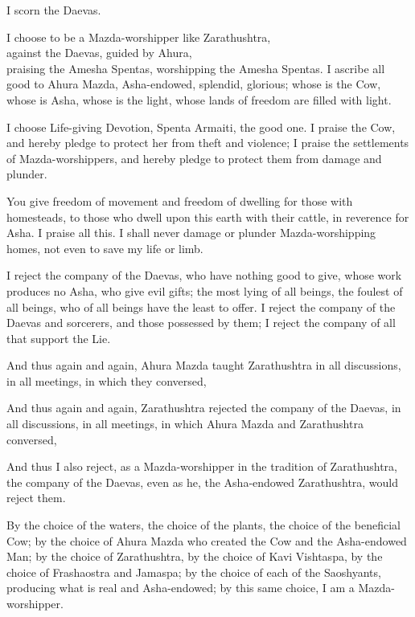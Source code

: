 \documentclass{book}
\begin{document}
\beforeeledchapter

\begin{pages}

\begin{Leftside}
\beginnumbering

\pstart
{}
\pend

\pstart
\centerline{I scorn the Daevas.}
\pend

\numberpstarttrue
\autopar

I choose to be a Mazda-worshipper like Zarathushtra,\\
against the Daevas, guided by Ahura,\\
praising the Amesha Spentas, worshipping the Amesha Spentas. I ascribe all good to Ahura Mazda, Asha-endowed, splendid, glorious; whose is the Cow, whose is Asha, whose is the light, whose lands of freedom are filled with light.

I choose Life-giving Devotion, Spenta Armaiti, the good one. I praise the Cow, and hereby pledge to protect her from theft and violence; I praise the settlements of Mazda-worshippers, and hereby pledge to protect them from damage and plunder.

You give freedom of movement and freedom of dwelling for those with homesteads, to those who dwell upon this earth with their cattle, in reverence for Asha.  I praise all this. I shall never damage or plunder Mazda-worshipping homes, not even to save my life or limb.

I reject the company of the Daevas, who have nothing good to give, whose work produces no Asha, who give evil gifts; the most lying of all beings, the foulest of all beings, who of all beings have the least to offer.  I reject the company of the Daevas and sorcerers, and those possessed by them; I reject the company of all that support the Lie.

And thus again and again, Ahura Mazda taught Zarathushtra in all discussions, in all meetings, in which they conversed,

And thus again and again, Zarathushtra rejected the company of the Daevas, in all discussions, in all meetings, in which Ahura Mazda and Zarathushtra conversed,

And thus I also reject, as a Mazda-worshipper in the tradition of Zarathushtra, the company of the Daevas, even as he, the Asha-endowed Zarathushtra, would reject them.

By the choice of the waters, the choice of the plants, the choice of the beneficial  Cow; by the choice of Ahura Mazda who created the Cow and the Asha-endowed Man; by the choice of Zarathushtra, by the choice of Kavi Vishtaspa, by the choice of Frashaostra and Jamaspa; by the choice of each of the Saoshyants, producing what is real and Asha-endowed; by this same choice, I am a Mazda-worshipper.


\end{Leftside}
\end{pages}
\end{document}
